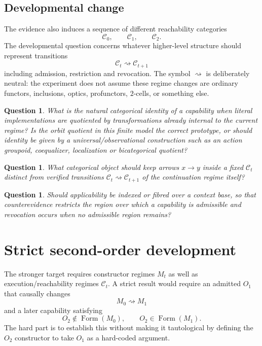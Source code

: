 \documentclass[11pt]{article}
\newtheorem{question}[definition]{Question}
\newcommand{\CapForm}{\operatorname{Form}}
\begin{document}
\subsection*{Developmental change}
The evidence also induces a sequence of different reachability categories
\[
\mathcal C_0,\qquad \mathcal C_1,\qquad \mathcal C_2.
\]
The developmental question concerns whatever higher-level structure should represent transitions
\[
\mathcal C_t\rightsquigarrow\mathcal C_{t+1}
\]
including admission, restriction and revocation. The symbol $\rightsquigarrow$ is deliberately
neutral: the experiment does not assume these regime changes are ordinary functors, inclusions,
optics, profunctors, $2$-cells, or something else.

\begin{question}
What is the natural categorical identity of a capability when literal implementations are
quotiented by transformations already internal to the current regime? Is the orbit quotient in
this finite model the correct prototype, or should identity be given by a universal/observational
construction such as an action groupoid, coequalizer, localization or bicategorical quotient?
\end{question}

\begin{question}
What categorical object should keep arrows $x\to y$ inside a fixed $\mathcal C_t$ distinct from
verified transitions $\mathcal C_t\rightsquigarrow\mathcal C_{t+1}$ of the continuation regime itself?
\end{question}

\begin{question}
Should applicability be indexed or fibred over a context base, so that counterevidence restricts
the region over which a capability is admissible and revocation occurs when no admissible region remains?
\end{question}

\section{Strict second-order development}

The stronger target requires constructor regimes $M_t$ as well as execution/reachability regimes
$\mathcal C_t$. A strict result would require an admitted $O_1$ that causally changes
\[
M_0\rightsquigarrow M_1
\]
and a later capability satisfying
\[
O_2\notin\CapForm(M_0),
\qquad
O_2\in\CapForm(M_1).
\]
The hard part is to establish this without making it tautological by defining the $O_2$
constructor to take $O_1$ as a hard-coded argument.
\end{document}
